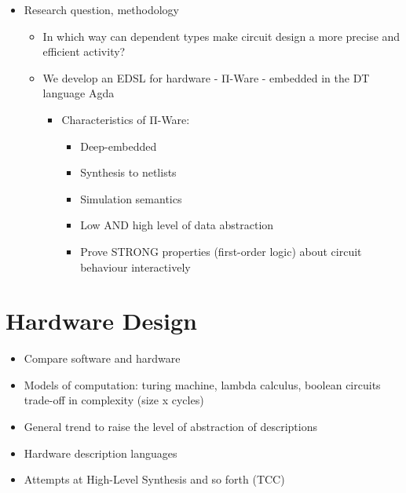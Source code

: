 \documentclass[a4paper,draft]{report}
\begin{document}

        \begin{itemize}
            \item Research question, methodology
            \begin{itemize}
                \item In which way can dependent types make circuit design a more precise and efficient activity?
                \item We develop an EDSL for hardware - Π-Ware - embedded in the DT language Agda
                \begin{itemize}
                    \item Characteristics of Π-Ware:
                    \begin{itemize}
                        \item Deep-embedded
                        \item Synthesis to netlists
                        \item Simulation semantics
                        \item Low AND high level of data abstraction
                        \item Prove STRONG properties (first-order logic) about circuit behaviour interactively
                    \end{itemize}
                \end{itemize}
            \end{itemize}
        \end{itemize}


    \chapter{Hardware Design}
    \label{chap:hardware}
        \begin{itemize}
            \item Compare software and hardware
            \item Models of computation: turing machine, lambda calculus, boolean circuits
                \subitem trade-off in complexity (size x cycles)

            \item General trend to raise the level of abstraction of descriptions
            \item Hardware description languages

            \item Attempts at High-Level Synthesis and so forth (TCC)
        \end{itemize}
\end{document}
